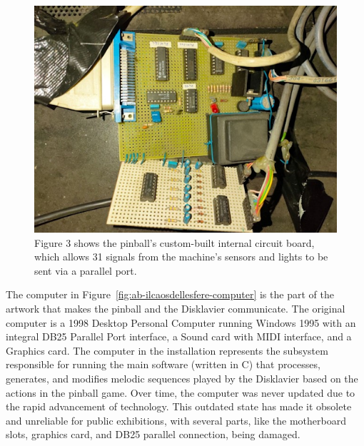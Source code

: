 \begin{figure}[!h]
    \centering
    \includegraphics[width=\linewidth]{chapters/appendix/b/image/figb-ilcaosdellesfere-pcb.jpg}
    \caption{Figure 3 shows the pinball’s custom-built internal circuit board, which allows 31 signals from the machine’s sensors and lights to be sent via a parallel port.}
    \label{fig:ab-ilcaosdellesfere-pcb}
\end{figure}
The computer in Figure~\ref{fig:ab-ilcaosdellesfere-computer} is the part of the artwork that makes the pinball and the Disklavier communicate. The original computer is a 1998 Desktop Personal Computer running Windows 1995 with an integral DB25 Parallel Port interface, a Sound card with MIDI interface, and a Graphics card. The computer in the installation represents the subsystem responsible for running the main software (written in C) that processes, generates, and modifies melodic sequences played by the Disklavier based on the actions in the pinball game. Over time, the computer was never updated due to the rapid advancement of technology. This outdated state has made it obsolete and unreliable for public exhibitions, with several parts, like the motherboard slots, graphics card, and DB25 parallel connection, being damaged.
